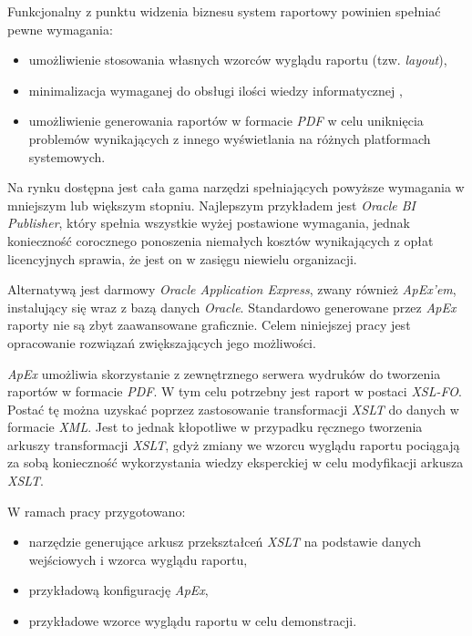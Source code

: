 \documentclass[11pt,a4paper]{article}
\begin{document}
Funkcjonalny z punktu widzenia biznesu system raportowy powinien spełniać pewne wymagania:
\begin{itemize}
	\item umożliwienie stosowania własnych wzorców wyglądu raportu (tzw. \emph{layout}),
	\item minimalizacja wymaganej do obsługi ilości wiedzy informatycznej ,
	\item umożliwienie generowania raportów w formacie \emph{PDF} w celu uniknięcia problemów wynikających z innego wyświetlania na różnych platformach systemowych.
\end{itemize}

Na rynku dostępna jest cała gama narzędzi spełniających powyższe wymagania w mniejszym lub większym stopniu. Najlepszym przykładem jest \emph{Oracle BI Publisher}, który spełnia wszystkie wyżej postawione wymagania, jednak konieczność corocznego ponoszenia niemałych kosztów wynikających z opłat licencyjnych sprawia, że jest on w zasięgu niewielu organizacji.

Alternatywą jest darmowy \emph{Oracle Application Express}, zwany również \emph{ApEx'em}, instalujący się wraz z bazą danych \emph{Oracle}. Standardowo generowane przez \emph{ApEx} raporty nie są zbyt zaawansowane graficznie. Celem niniejszej pracy jest opracowanie rozwiązań zwiększających jego możliwości.

\emph{ApEx} umożliwia skorzystanie z zewnętrznego serwera wydruków do tworzenia raportów w formacie \emph{PDF}. W tym celu potrzebny jest raport w postaci \emph{XSL-FO}. Postać tę można uzyskać poprzez zastosowanie transformacji \emph{XSLT} do danych w formacie \emph{XML}. Jest to jednak kłopotliwe w przypadku ręcznego tworzenia arkuszy transformacji \emph{XSLT}, gdyż zmiany we wzorcu wyglądu raportu pociągają za sobą konieczność wykorzystania wiedzy eksperckiej w celu modyfikacji arkusza \emph{XSLT}.

\bigskip
W ramach pracy przygotowano:
\begin{itemize}
	\item narzędzie generujące arkusz przekształceń \emph{XSLT} na podstawie danych wejściowych i wzorca wyglądu raportu,
	\item przykładową konfigurację \emph{ApEx},
	\item przykładowe wzorce wyglądu raportu w celu demonstracji.
\end{itemize}
\end{document}
